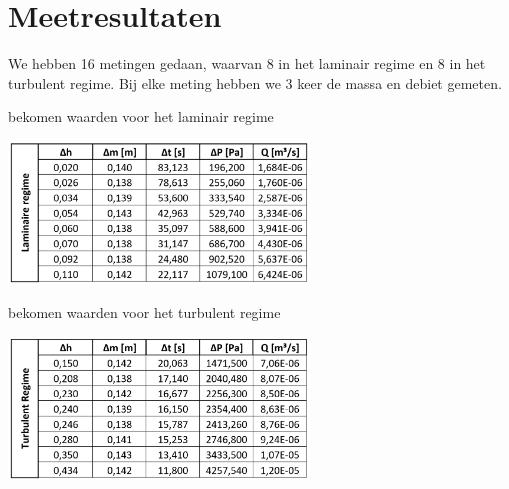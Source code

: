 \section{Meetresultaten}

We hebben 16 metingen gedaan, waarvan 8 in het laminair regime en 
8 in het turbulent regime. Bij elke meting hebben we 3 keer de massa en
debiet gemeten.
\begin{table}
    \centering
    \caption{bekomen waarden voor het laminair regime}
    \label{tab:tab_lamflow}
    \includegraphics[width=0.6\textwidth]{img/lamflow.png}
\end{table}
\begin{table}
    \centering
    \caption{bekomen waarden voor het turbulent regime}
    \label{tab:tab_turbflow}
    \includegraphics[width=0.6\textwidth]{img/turbflow.png}
\end{table}

